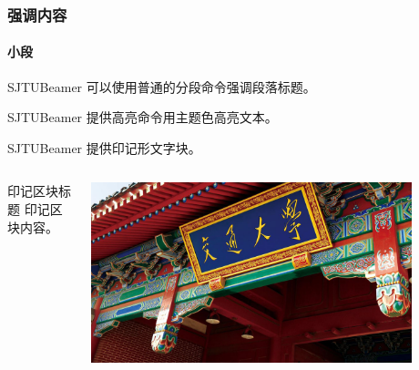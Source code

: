 \documentclass[
    aspectratio=169,  %
]{ctexbeamer}
\begin{document}
\begin{frame}
  \frametitle{强调内容}

  \paragraph{小段} SJTUBeamer 可以使用普通的分段命令强调段落标题。

   SJTUBeamer 提供高亮命令用主题色高亮文本。

   SJTUBeamer 提供印记形文字块。

  \stamphrule

  \begin{columns}
    \begin{column}{0.4\textwidth}
      \begin{stampblock}{印记区块标题}
        印记区块内容。
      \end{stampblock}
    \end{column}
    \begin{column}{0.3\textwidth}
      \begin{stampbox}
        \includegraphics[width=0.9\textwidth]{vi/sjtu-vi-sjtuphoto.jpg}
      \end{stampbox}
    \end{column}
    \begin{column}{0.3\textwidth}
    \end{column}
  \end{columns}

\end{frame}
\end{document}
